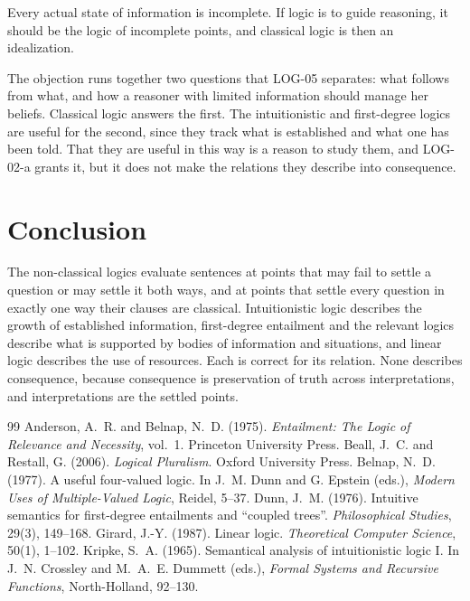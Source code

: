 \documentclass{situationist-preprint}
\begin{document}
\begin{objection}
Every actual state of information is incomplete. If logic is to guide reasoning, it should be the logic of incomplete points, and classical logic is then an idealization.
\end{objection}

\begin{reply}
The objection runs together two questions that LOG-05 separates: what follows from what, and how a reasoner with limited information should manage her beliefs. Classical logic answers the first. The intuitionistic and first-degree logics are useful for the second, since they track what is established and what one has been told. That they are useful in this way is a reason to study them, and LOG-02-a grants it, but it does not make the relations they describe into consequence.
\end{reply}

\section{Conclusion}

The non-classical logics evaluate sentences at points that may fail to settle a question or may settle it both ways, and at points that settle every question in exactly one way their clauses are classical. Intuitionistic logic describes the growth of established information, first-degree entailment and the relevant logics describe what is supported by bodies of information and situations, and linear logic describes the use of resources. Each is correct for its relation. None describes consequence, because consequence is preservation of truth across interpretations, and interpretations are the settled points.

\begin{thebibliography}{99}\small
{} Anderson, A.~R. and Belnap, N.~D. (1975). \emph{Entailment: The Logic of Relevance and Necessity}, vol.~1. Princeton University Press.
 Beall, J.~C. and Restall, G. (2006). \emph{Logical Pluralism}. Oxford University Press.
 Belnap, N.~D. (1977). A useful four-valued logic. In J.~M. Dunn and G. Epstein (eds.), \emph{Modern Uses of Multiple-Valued Logic}, Reidel, 5--37.
 Dunn, J.~M. (1976). Intuitive semantics for first-degree entailments and \enquote{coupled trees}. \emph{Philosophical Studies}, 29(3), 149--168.
 Girard, J.-Y. (1987). Linear logic. \emph{Theoretical Computer Science}, 50(1), 1--102.
 Kripke, S.~A. (1965). Semantical analysis of intuitionistic logic I. In J.~N. Crossley and M.~A.~E. Dummett (eds.), \emph{Formal Systems and Recursive Functions}, North-Holland, 92--130.
\end{thebibliography}
\end{document}
